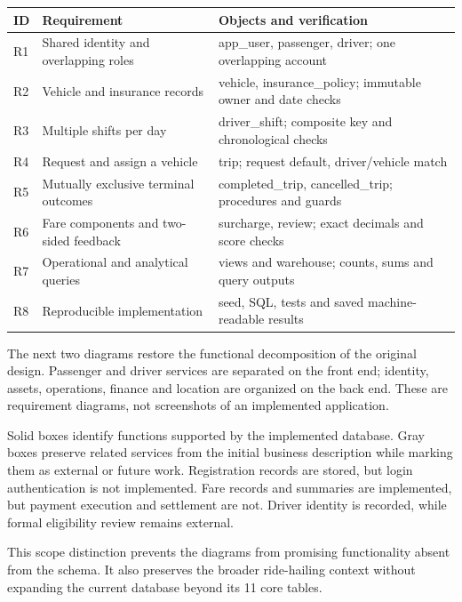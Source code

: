 \documentclass[11pt,a4paper]{article}
\begin{document}
\par\begingroup\small\noindent
\begin{tabularx}{\linewidth}{p{.8cm}p{5cm}Y}
\toprule
ID & Requirement & Objects and verification\\\midrule
R1 & Shared identity and overlapping roles & app\_\allowbreak{}user, passenger, driver; one overlapping account\\
R2 & Vehicle and insurance records & vehicle, insurance\_\allowbreak{}policy; immutable owner and date checks\\
R3 & Multiple shifts per day & driver\_\allowbreak{}shift; composite key and chronological checks\\
R4 & Request and assign a vehicle & trip; request default, driver/vehicle match\\
R5 & Mutually exclusive terminal outcomes & completed\_\allowbreak{}trip, cancelled\_\allowbreak{}trip; procedures and guards\\
R6 & Fare components and two-sided feedback & surcharge, review; exact decimals and score checks\\
R7 & Operational and analytical queries & views and warehouse; counts, sums and query outputs\\
R8 & Reproducible implementation & seed, SQL, tests and saved machine-readable results\\
\bottomrule
\end{tabularx}
\par\endgroup

The next two diagrams restore the functional decomposition of the original design. Passenger and driver services are separated on the front end; identity, assets, operations, finance and location are organized on the back end. These are requirement diagrams, not screenshots of an implemented application.

Solid boxes identify functions supported by the implemented database. Gray boxes preserve related services from the initial business description while marking them as external or future work. Registration records are stored, but login authentication is not implemented. Fare records and summaries are implemented, but payment execution and settlement are not. Driver identity is recorded, while formal eligibility review remains external.

This scope distinction prevents the diagrams from promising functionality absent from the schema. It also preserves the broader ride-hailing context without expanding the current database beyond its 11 core tables.
\end{document}
